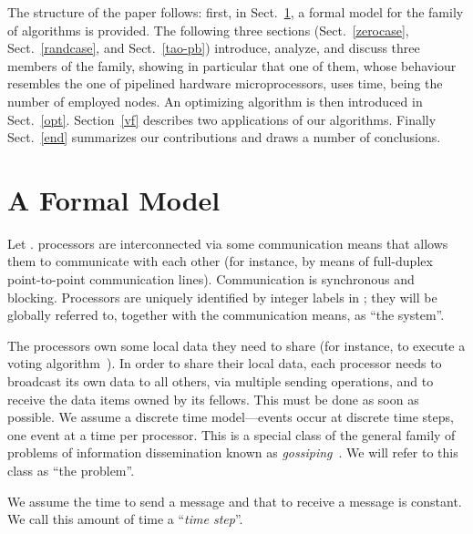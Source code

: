 \documentclass{elsart}
\begin{document}
The structure of the paper follows:
first, in Sect.~\ref{model}, a formal model for the family of algorithms is provided.
The following three sections (Sect.~\ref{zerocase}, Sect.~\ref{randcase}, and Sect.~\ref{tao-pb})
introduce, analyze, and discuss 
three members of the family, showing in particular that one of them,
whose behaviour resembles the one of pipelined hardware microprocessors,
uses  time,  being the number of employed nodes.
An optimizing algorithm is then introduced in Sect.~\ref{opt}.
Section~\ref{vf} describes two applications of our algorithms.
Finally Sect.~\ref{end} summarizes our contributions 
and draws a number of conclusions.


\section{A Formal Model}\label{model}
\begin{defn}[system]
Let .  processors are interconnected via some communication
means that allows them to communicate with each other (for instance, by means
of full-duplex point-to-point communication lines).
Communication is synchronous and blocking.
Processors are uniquely identified by integer labels in ;
they will be globally referred to, together with the communication
means, as ``the system''.
\end{defn}

\begin{defn}[problem]\label{problem}
The processors own some local data
they need to share (for instance, to execute a voting algorithm~\emph{\cite{John89a}}).
In order to share their local data, each processor needs to
broadcast its own data to all others, via multiple sending operations,
and to receive the  data items
owned by its fellows. This must be done as soon as possible.
We assume a discrete time model---events occur at discrete time
steps, one event at a time per processor. 
This is a special class of the general family
of problems of information dissemination
known as \emph{gossiping\/}~\emph{\cite{Goss,BGRV98,Gon03}}. We will refer to this class
as ``the problem''.
\end{defn}

\begin{defn}
\label{timestep}
We assume the time to send a message and that to receive a message
is constant. We call this amount of time a ``\emph{time step}''.
\end{defn}
\end{document}
